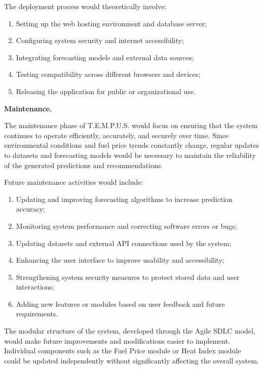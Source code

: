 \documentclass[12pt]{article}
\begin{document}
\medskip
\noindent The deployment process would theoretically involve:
\begin{enumerate}
    \item Setting up the web hosting environment and database server;
    \item Configuring system security and internet accessibility;
    \item Integrating forecasting models and external data sources;
    \item Testing compatibility across different browsers and devices;
    \item Releasing the application for public or organizational use.
\end{enumerate}

\bigskip
\noindent\textbf{Maintenance.}

The maintenance phase of T.E.M.P.U.S. would focus on ensuring that the system continues to operate efficiently, accurately, and securely over time. Since environmental conditions and fuel price trends constantly change, regular updates to datasets and forecasting models would be necessary to maintain the reliability of the generated predictions and recommendations.

\medskip
\noindent Future maintenance activities would include:
\begin{enumerate}
    \item Updating and improving forecasting algorithms to increase prediction accuracy;
    \item Monitoring system performance and correcting software errors or bugs;
    \item Updating datasets and external API connections used by the system;
    \item Enhancing the user interface to improve usability and accessibility;
    \item Strengthening system security measures to protect stored data and user interactions;
    \item Adding new features or modules based on user feedback and future requirements.
\end{enumerate}

The modular structure of the system, developed through the Agile SDLC model, would make future improvements and modifications easier to implement. Individual components such as the Fuel Price module or Heat Index module could be updated independently without significantly affecting the overall system.

\end{document}
